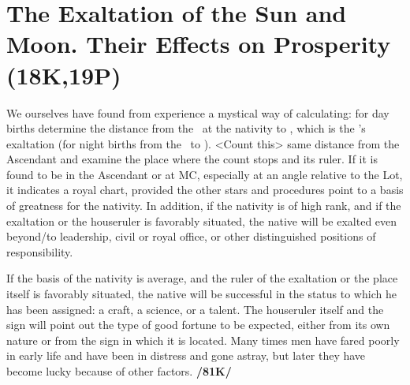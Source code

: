 \section{The Exaltation of the Sun and Moon. Their Effects on Prosperity (18K,19P)}
We ourselves have found from experience a mystical way of calculating: for day births determine the distance from the \Sun\, at the nativity to \Aries, which is the \Sun’s exaltation (for night births from the \Moon\, to \Taurus). <Count this> same distance from the Ascendant and examine the place where the count stops and its ruler. If it is found to be in the Ascendant or at MC, especially at an angle relative to the Lot, it
indicates a royal chart, provided the other stars and procedures point to a basis of greatness for the nativity. In addition, if the nativity is of high rank, and if the exaltation or the houseruler is favorably situated, the native will be exalted even beyond/to leadership, civil or royal office, or other distinguished positions of responsibility. 

If the basis of the nativity is average, and the ruler of the exaltation or the place itself is favorably situated, the native will be successful in the status to which he has been assigned: a craft, a science, or a talent. The houseruler itself and the sign will point out the type of good fortune to be expected, either from its own nature or from the sign in which it is located. Many times men have fared poorly in early life and have been in distress and gone astray, but later they have become lucky because of other factors. \textbf{/81K/}

\newpage